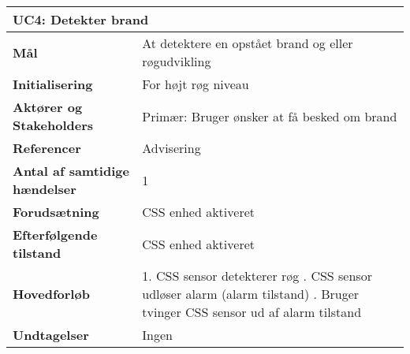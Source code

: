 \begin{table}[H] \centering
\begin{tabular}{|p{6cm}|p{8cm}|}
	\hline
\multicolumn{2}{|l|}{\textbf{UC4: Detekter brand}} \\\hline
\textbf{Mål}								&At detektere en opstået brand og eller røgudvikling \\\hline
\textbf{Initialisering}					&For højt røg niveau\\\hline
\textbf{Aktører og Stakeholders}			&Primær: Bruger ønsker at få besked om brand \\\hline
\textbf{Referencer}						&Advisering \\\hline
\textbf{Antal af samtidige hændelser}	&1 \\\hline
\textbf{Forudsætning}					&CSS enhed aktiveret  \\\hline
\textbf{Efterfølgende tilstand}			&CSS enhed aktiveret \\\hline
\textbf{Hovedforløb}						&   
1. CSS sensor detekterer røg \newline 
2. CSS sensor udløser alarm (alarm tilstand) \newline 
3. Bruger tvinger CSS sensor ud af alarm tilstand\\\hline
\textbf{Undtagelser}						&Ingen \\\hline
	\end{tabular}
	\label{UC4} 
\end{table}